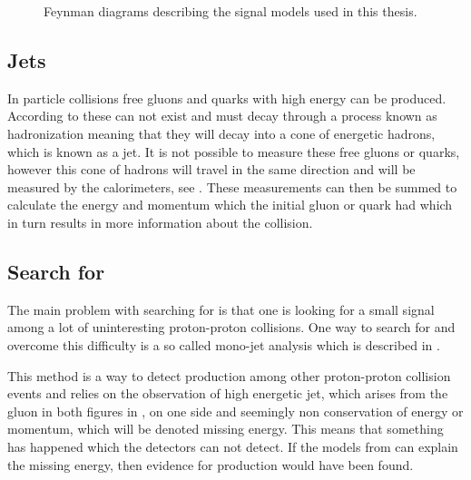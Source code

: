  \begin{figure}[H] %
    \hfill
    \caption{Feynman diagrams describing the signal models used in this thesis.}
    \label{fig:opfeyn}
  \end{figure}


\subsection{Jets}\label{sec:tb:subsec:jets}
In particle collisions free gluons and quarks with high energy can be produced. According to \abbrQFT these can not exist and must decay through a process known as hadronization meaning that they will decay into a cone of energetic hadrons, which is known as a jet. It is not possible to measure these free gluons or quarks, however this cone of hadrons will travel in the same direction and will be measured by the calorimeters, see . These measurements can then be summed to calculate the energy and momentum which the initial gluon or quark had which in turn results in more information about the collision.

\subsection{Search for \abbrWIMPS}\label{sec:tb:subsec:WIMPS}
The main problem with searching for \abbrWIMPS is that one is looking for a small signal among a lot of uninteresting proton-proton collisions. One way to search for \abbrWIMPS and overcome this difficulty is a so called mono-jet analysis which is described in . 

This method is a way to detect \abbrWIMP production among other proton-proton collision events and relies on the observation of high energetic jet, which arises from the gluon in both figures in , on one side and seemingly non conservation of energy or momentum, which will be denoted missing energy. This means that something has happened which the detectors can not detect. If the models from  can explain the missing energy, then evidence for \abbrWIMP production would have been found.

